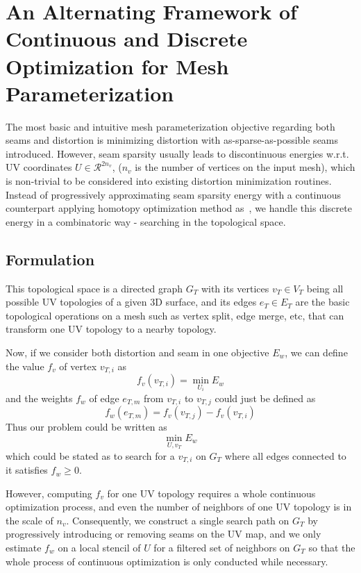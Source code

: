 \section{An Alternating Framework of Continuous and Discrete Optimization for Mesh Parameterization}

The most basic and intuitive mesh parameterization objective regarding both seams and distortion is minimizing distortion with as-sparse-as-possible seams introduced. However, seam sparsity usually leads to discontinuous energies w.r.t. UV coordinates $U \in \mathcal{R}^{2n_v}$, ($n_v$ is the number of vertices on the input mesh), which is non-trivial to be considered into existing distortion minimization routines. Instead of progressively approximating seam sparsity energy with a continuous counterpart applying homotopy optimization method as~\cite{Poranne2017Autocuts}, we handle this discrete energy in a combinatoric way - searching in the topological space.

\subsection{Formulation}

This topological space is a directed graph $G_T$ with its vertices $v_T \in V_T$ being all possible UV topologies of a given 3D surface, and its edges $e_T \in E_T$ are the basic topological operations on a mesh such as vertex split, edge merge, etc, that can transform one UV topology to a nearby topology.

Now, if we consider both distortion and seam in one objective $E_w$, we can define the value $f_v$ of vertex $v_{T,i}$ as 
\[ f_v(v_{T,i}) = \min_{U_i} E_w \]
and the weights $f_w$ of edge $e_{T,m}$ from $v_{T,i}$ to $v_{T,j}$ could just be defined as 
\[ f_w(e_{T,m}) = f_v(v_{T,j}) - f_v(v_{T,i}) \]
Thus our problem could be written as
\[ \min_{U, v_T} E_w \]
which could be stated as to search for a $v_{T,i}$ on $G_T$ where all edges connected to it satisfies $f_w \geq 0$. 

However, computing $f_v$ for one UV topology requires a whole continuous optimization process, and even the number of neighbors of one UV topology is in the scale of $n_v$. Consequently, we construct a single search path on $G_T$ by progressively introducing or removing seams on the UV map, and we only estimate $f_w$ on a local stencil of $U$ for a filtered set of neighbors on $G_T$ so that the whole process of continuous optimization is only conducted while necessary.

